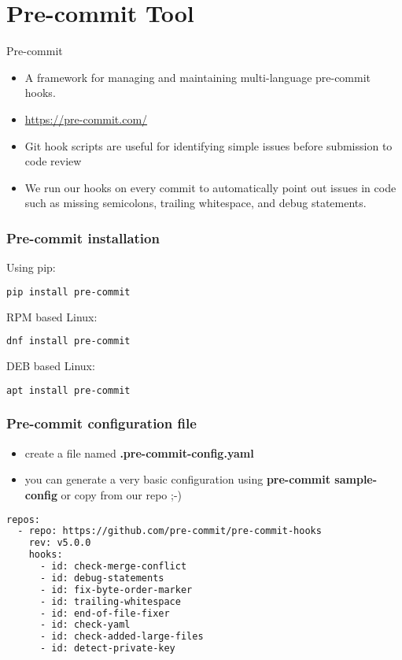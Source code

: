 \section{Pre-commit Tool}

\begin{frame}[c]{Pre-commit}
  \begin{itemize}
    \item A framework for managing and maintaining multi-language pre-commit
      hooks.
    \item \href{https://pre-commit.com/}{https://pre-commit.com/}
    \pausa
    \item Git hook scripts are useful for identifying simple issues before
      submission to code review
    \pausa
    \item We run our hooks on every commit to automatically point out issues
      in code such as missing semicolons, trailing whitespace, and debug
      statements.
  \end{itemize}
\end{frame}

\begin{frame}[fragile]
  \frametitle{Pre-commit installation}

  Using pip:
  
  \begin{lstlisting}[language=Bash]
 pip install pre-commit
  \end{lstlisting}
  \vspace{\baselineskip}

  RPM based Linux:
  
  \begin{lstlisting}[language=Bash]
 dnf install pre-commit
  \end{lstlisting}
  \vspace{\baselineskip}

  DEB based Linux:
  
  \begin{lstlisting}[language=Bash]
 apt install pre-commit
  \end{lstlisting}
\end{frame}

\begin{frame}[fragile]
  \frametitle{Pre-commit configuration file}
  \begin{itemize}
    \item create a file named \textbf{.pre-commit-config.yaml}
    \pausa
    \item you can generate a very basic configuration using
      \textbf{pre-commit sample-config}
      or copy from our repo ;-)
  \end{itemize}

  \begin{lstlisting}[language=Bash]
repos:
  - repo: https://github.com/pre-commit/pre-commit-hooks
    rev: v5.0.0
    hooks:
      - id: check-merge-conflict
      - id: debug-statements
      - id: fix-byte-order-marker
      - id: trailing-whitespace
      - id: end-of-file-fixer
      - id: check-yaml
      - id: check-added-large-files
      - id: detect-private-key
  \end{lstlisting}
\end{frame}

